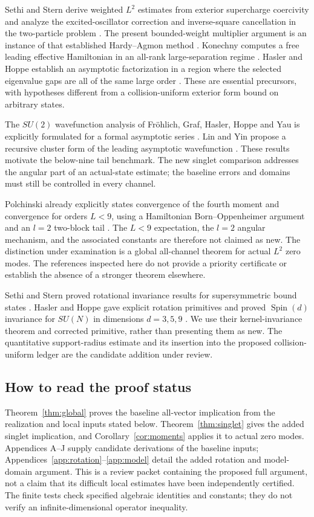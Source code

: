 \documentclass[11pt,letterpaper]{article}
\theoremstyle{definition}\newtheorem{hypothesis}[theorem]{Hypothesis}
\numberwithin{equation}{section}
\begin{document}
Sethi and Stern derive weighted $L^2$ estimates from exterior supercharge coercivity and analyze the excited-oscillator correction and inverse-square cancellation in the two-particle problem \cite[manuscript pp.~20--21 and 37--39]{SS}. The present bounded-weight multiplier argument is an instance of that established Hardy--Agmon method \cite{Agmon}. Konechny computes a free leading effective Hamiltonian in an all-rank large-separation regime \cite{K}. Hasler and Hoppe establish an asymptotic factorization in a region where the selected eigenvalue gaps are all of the same large order \cite{HH}. These are essential precursors, with hypotheses different from a collision-uniform exterior form bound on arbitrary states.

The $SU(2)$ wavefunction analysis of Fr\"ohlich, Graf, Hasler, Hoppe and Yau is explicitly formulated for a formal asymptotic series \cite{FGHHY}. Lin and Yin propose a recursive cluster form of the leading asymptotic wavefunction \cite{LY}. These results motivate the below-nine tail benchmark. The new singlet comparison addresses the angular part of an actual-state estimate; the baseline errors and domains must still be controlled in every channel.

Polchinski already explicitly states convergence of the fourth moment and convergence for orders $L<9$, using a Hamiltonian Born--Oppenheimer argument and an $l=2$ two-block tail \cite[printed p.~12, Eqs.~(7.8)--(7.10)]{P}. The $L<9$ expectation, the $l=2$ angular mechanism, and the associated constants are therefore not claimed as new. The distinction under examination is a global all-channel theorem for actual $L^2$ zero modes. The references inspected here do not provide a priority certificate or establish the absence of a stronger theorem elsewhere.

Sethi and Stern proved rotational invariance results for supersymmetric bound states \cite{SSI}. Hasler and Hoppe gave explicit rotation primitives and proved $\operatorname{Spin}(d)$ invariance for $SU(N)$ in dimensions $d=3,5,9$ \cite{HHI}. We use their kernel-invariance theorem and corrected primitive, rather than presenting them as new. The quantitative support-radius estimate and its insertion into the proposed collision-uniform ledger are the candidate addition under review.

\subsection{How to read the proof status}
Theorem~\ref{thm:global} proves the baseline all-vector implication from the realization and local inputs stated below. Theorem~\ref{thm:singlet} gives the added singlet implication, and Corollary~\ref{cor:moments} applies it to actual zero modes. Appendices A--J supply candidate derivations of the baseline inputs; Appendices~\ref{app:rotation}--\ref{app:model} detail the added rotation and model-domain argument. This is a review packet containing the proposed full argument, not a claim that its difficult local estimates have been independently certified. The finite tests check specified algebraic identities and constants; they do not verify an infinite-dimensional operator inequality.
\end{document}
